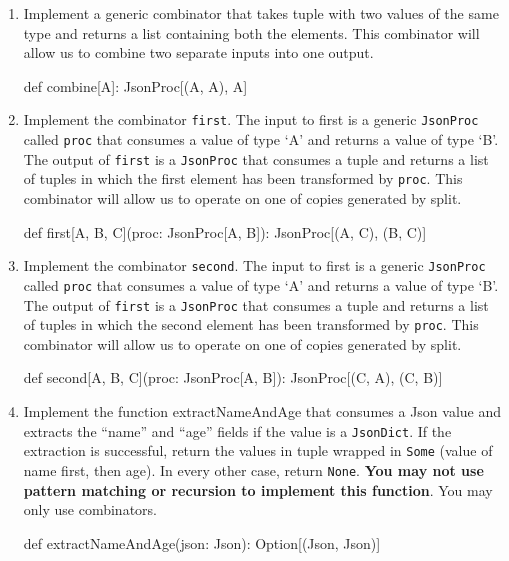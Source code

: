 \begin{enumerate}
    \item Implement a generic combinator that takes tuple with two values
    of the same type and returns a list containing both the elements. This
    combinator will allow us to combine two separate inputs into one output.
    \begin{scalacode}
    def combine[A]: JsonProc[(A, A), A]
    \end{scalacode}

    \item Implement the combinator \texttt{first}. The input to first is a
    generic \texttt{JsonProc} called \texttt{proc} that consumes a value of
    type `A' and returns a value of type `B'. The output of \texttt{first} is
    a \texttt{JsonProc} that consumes a tuple and returns a list of tuples in
    which the first element has been transformed by \texttt{proc}. This
    combinator will allow us to operate on one of copies generated by split.
    \begin{scalacode}
    def first[A, B, C](proc: JsonProc[A, B]): JsonProc[(A, C), (B, C)]
    \end{scalacode}

    \item Implement the combinator \texttt{second}. The input to first is a
    generic \texttt{JsonProc} called \texttt{proc} that consumes a value of
    type `A' and returns a value of type `B'. The output of \texttt{first} is
    a \texttt{JsonProc} that consumes a tuple and returns a list of tuples in
    which the second element has been transformed by \texttt{proc}. This
    combinator will allow us to operate on one of copies generated by split.
    \begin{scalacode}
    def second[A, B, C](proc: JsonProc[A, B]): JsonProc[(C, A), (C, B)]
    \end{scalacode}

    \item Implement the function extractNameAndAge that consumes a Json value
    and extracts the ``name'' and ``age'' fields if the value is a
    \texttt{JsonDict}. If the extraction is successful, return the values in
    tuple wrapped in \texttt{Some} (value of name first, then age). In every
    other case, return \texttt{None}. \textbf{You may not use pattern
    matching or recursion to implement this function}. You may only use
    combinators.
    \begin{scalacode}
    def extractNameAndAge(json: Json): Option[(Json, Json)]
    \end{scalacode}


\end{enumerate}
